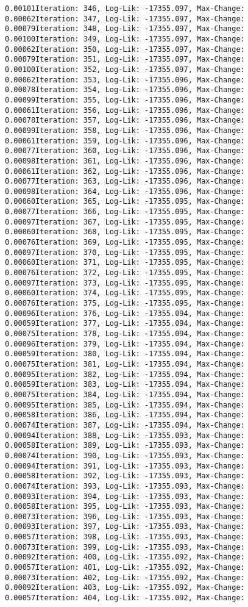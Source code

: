 \documentclass[
]{article}
\begin{document}
\begin{verbatim}
0.00101Iteration: 346, Log-Lik: -17355.097, Max-Change: 0.00062Iteration: 347, Log-Lik: -17355.097, Max-Change: 0.00079Iteration: 348, Log-Lik: -17355.097, Max-Change: 0.00100Iteration: 349, Log-Lik: -17355.097, Max-Change: 0.00062Iteration: 350, Log-Lik: -17355.097, Max-Change: 0.00079Iteration: 351, Log-Lik: -17355.097, Max-Change: 0.00100Iteration: 352, Log-Lik: -17355.097, Max-Change: 0.00062Iteration: 353, Log-Lik: -17355.096, Max-Change: 0.00078Iteration: 354, Log-Lik: -17355.096, Max-Change: 0.00099Iteration: 355, Log-Lik: -17355.096, Max-Change: 0.00061Iteration: 356, Log-Lik: -17355.096, Max-Change: 0.00078Iteration: 357, Log-Lik: -17355.096, Max-Change: 0.00099Iteration: 358, Log-Lik: -17355.096, Max-Change: 0.00061Iteration: 359, Log-Lik: -17355.096, Max-Change: 0.00077Iteration: 360, Log-Lik: -17355.096, Max-Change: 0.00098Iteration: 361, Log-Lik: -17355.096, Max-Change: 0.00061Iteration: 362, Log-Lik: -17355.096, Max-Change: 0.00077Iteration: 363, Log-Lik: -17355.096, Max-Change: 0.00098Iteration: 364, Log-Lik: -17355.096, Max-Change: 0.00060Iteration: 365, Log-Lik: -17355.095, Max-Change: 0.00077Iteration: 366, Log-Lik: -17355.095, Max-Change: 0.00097Iteration: 367, Log-Lik: -17355.095, Max-Change: 0.00060Iteration: 368, Log-Lik: -17355.095, Max-Change: 0.00076Iteration: 369, Log-Lik: -17355.095, Max-Change: 0.00097Iteration: 370, Log-Lik: -17355.095, Max-Change: 0.00060Iteration: 371, Log-Lik: -17355.095, Max-Change: 0.00076Iteration: 372, Log-Lik: -17355.095, Max-Change: 0.00097Iteration: 373, Log-Lik: -17355.095, Max-Change: 0.00060Iteration: 374, Log-Lik: -17355.095, Max-Change: 0.00076Iteration: 375, Log-Lik: -17355.095, Max-Change: 0.00096Iteration: 376, Log-Lik: -17355.094, Max-Change: 0.00059Iteration: 377, Log-Lik: -17355.094, Max-Change: 0.00075Iteration: 378, Log-Lik: -17355.094, Max-Change: 0.00096Iteration: 379, Log-Lik: -17355.094, Max-Change: 0.00059Iteration: 380, Log-Lik: -17355.094, Max-Change: 0.00075Iteration: 381, Log-Lik: -17355.094, Max-Change: 0.00095Iteration: 382, Log-Lik: -17355.094, Max-Change: 0.00059Iteration: 383, Log-Lik: -17355.094, Max-Change: 0.00075Iteration: 384, Log-Lik: -17355.094, Max-Change: 0.00095Iteration: 385, Log-Lik: -17355.094, Max-Change: 0.00058Iteration: 386, Log-Lik: -17355.094, Max-Change: 0.00074Iteration: 387, Log-Lik: -17355.094, Max-Change: 0.00094Iteration: 388, Log-Lik: -17355.093, Max-Change: 0.00058Iteration: 389, Log-Lik: -17355.093, Max-Change: 0.00074Iteration: 390, Log-Lik: -17355.093, Max-Change: 0.00094Iteration: 391, Log-Lik: -17355.093, Max-Change: 0.00058Iteration: 392, Log-Lik: -17355.093, Max-Change: 0.00074Iteration: 393, Log-Lik: -17355.093, Max-Change: 0.00093Iteration: 394, Log-Lik: -17355.093, Max-Change: 0.00058Iteration: 395, Log-Lik: -17355.093, Max-Change: 0.00073Iteration: 396, Log-Lik: -17355.093, Max-Change: 0.00093Iteration: 397, Log-Lik: -17355.093, Max-Change: 0.00057Iteration: 398, Log-Lik: -17355.093, Max-Change: 0.00073Iteration: 399, Log-Lik: -17355.093, Max-Change: 0.00092Iteration: 400, Log-Lik: -17355.092, Max-Change: 0.00057Iteration: 401, Log-Lik: -17355.092, Max-Change: 0.00073Iteration: 402, Log-Lik: -17355.092, Max-Change: 0.00092Iteration: 403, Log-Lik: -17355.092, Max-Change: 0.00057Iteration: 404, Log-Lik: -17355.092, Max-Change: 
\end{verbatim}
\end{document}
